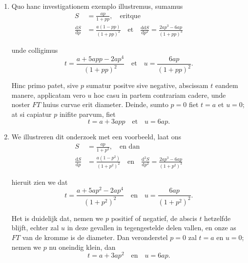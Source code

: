 \documentclass[10pt,a4paper]{article}
\newcommand{\switchenum}{\setcounter{enumi}{\arabic{enumi}-1}\switchcolumn}
\def\D{\mathrm{d}}
\begin{document}
\begin{paracol}{2}
\begin{enumerate}[topsep=1px]
		\switchcolumn*
		
		\item Quo hanc investigationem exemplo illustremus, sumamus
		\begin{align*}
			S &= \frac{ap}{1+pp}, \quad\text{eritque}\\
			\frac{\D S}{\D p} &= \frac{a(1-pp)}{(1+pp)^2} \quad \text{et} \quad \frac{\D \D S}{\D p^2} = \frac{2ap^3-6ap}{(1+pp)^3}
		\end{align*}

		unde colligimus
		\[
			t = \frac{a+5app-2ap^4}{(1+pp)^2}\quad \text{et} \quad u = \frac{6ap}{(1+pp)^2}.
		\]
		\par Hinc primo patet, sive $p$ sumatur positve sive negative, abscissam $t$ eandem manere, applicatam vero $u$ hoc casu in partem contrariam cadere, unde noster $FT$ huius curvae erit diameter. Deinde, sumto $p=0$ fiet $t=a$ et $u=0$; at si capiatur $p$ inifite parvum, fiet
		\[
			t = a + 3app\quad \text{et} \quad u= 6ap.
		\]
		
		\switchenum
		\item We illustreren dit onderzoek met een voorbeeld, laat ons
		\begin{align*}
			S &= \frac{ap}{1+p^2}, \quad\text{en dan}\\
			\frac{\D S}{\D p} &= \frac{a(1-p^2)}{(1+p^2)^2} \quad \text{en} \quad \frac{\D^2 S}{\D p^2} = \frac{2ap^3-6ap}{(1+p^2)^3}
		\end{align*}
		
		hieruit zien we dat
		\[
			t = \frac{a+5ap^2-2ap^4}{(1+p^2)^2}\quad \text{en} \quad u = \frac{6ap}{(1+p^2)^2}.
		\]
		\par Het is duidelijk dat, nemen we $p$ positief of negatief, de abscis $t$ hetzelfde blijft, echter zal $u$ in deze gevallen in tegengestelde delen vallen, en onze as $FT$ van de kromme is de diameter. Dan veronderstel $p=0$ zal $t=a$ en $u=0$; nemen we $p$ nu oneindig klein, dan
		\[
			t = a + 3ap^2\quad \text{en} \quad u= 6ap.
		\]
		

\end{enumerate}
\end{paracol}
\end{document}
